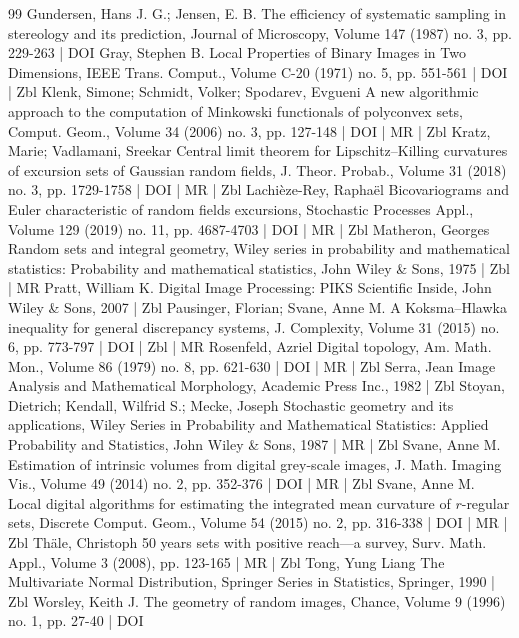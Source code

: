 \documentclass[10pt]{amsart}
\theoremstyle{definition}\newtheorem{defi}[theo]{Definition}\newtheorem{rema}[theo]{Remark}\newtheorem{exam}[theo]{Example}\newtheorem{exem}[theo]{Example}\newtheorem{nota}[theo]{Notation}
\begin{document}
\begin{thebibliography}{99}
Gundersen, Hans J. G.; Jensen, E. B. The efficiency of systematic sampling in stereology and its prediction, Journal of Microscopy, Volume 147 (1987) no. 3, pp. 229-263 | DOI
Gray, Stephen B. Local Properties of Binary Images in Two Dimensions, IEEE Trans. Comput., Volume C-20 (1971) no. 5, pp. 551-561 | DOI | Zbl
Klenk, Simone; Schmidt, Volker; Spodarev, Evgueni A new algorithmic approach to the computation of Minkowski functionals of polyconvex sets, Comput. Geom., Volume 34 (2006) no. 3, pp. 127-148 | DOI | MR | Zbl
Kratz, Marie; Vadlamani, Sreekar Central limit theorem for Lipschitz–Killing curvatures of excursion sets of Gaussian random fields, J. Theor. Probab., Volume 31 (2018) no. 3, pp. 1729-1758 | DOI | MR | Zbl
Lachièze-Rey, Raphaël Bicovariograms and Euler characteristic of random fields excursions, Stochastic Processes Appl., Volume 129 (2019) no. 11, pp. 4687-4703 | DOI | MR | Zbl
Matheron, Georges Random sets and integral geometry, Wiley series in probability and mathematical statistics: Probability and mathematical statistics, John Wiley \& Sons, 1975 | Zbl | MR
Pratt, William K. Digital Image Processing: PIKS Scientific Inside, John Wiley \& Sons, 2007 | Zbl
Pausinger, Florian; Svane, Anne M. A Koksma–Hlawka inequality for general discrepancy systems, J. Complexity, Volume 31 (2015) no. 6, pp. 773-797 | DOI | Zbl | MR
Rosenfeld, Azriel Digital topology, Am. Math. Mon., Volume 86 (1979) no. 8, pp. 621-630 | DOI | MR | Zbl
Serra, Jean Image Analysis and Mathematical Morphology, Academic Press Inc., 1982 | Zbl
Stoyan, Dietrich; Kendall, Wilfrid S.; Mecke, Joseph Stochastic geometry and its applications, Wiley Series in Probability and Mathematical Statistics: Applied Probability and Statistics, John Wiley \& Sons, 1987 | MR | Zbl
Svane, Anne M. Estimation of intrinsic volumes from digital grey-scale images, J. Math. Imaging Vis., Volume 49 (2014) no. 2, pp. 352-376 | DOI | MR | Zbl
Svane, Anne M. Local digital algorithms for estimating the integrated mean curvature of $r$-regular sets, Discrete Comput. Geom., Volume 54 (2015) no. 2, pp. 316-338 | DOI | MR | Zbl
Thäle, Christoph 50 years sets with positive reach—a survey, Surv. Math. Appl., Volume 3 (2008), pp. 123-165 | MR | Zbl
Tong, Yung Liang The Multivariate Normal Distribution, Springer Series in Statistics, Springer, 1990 | Zbl
Worsley, Keith J. The geometry of random images, Chance, Volume 9 (1996) no. 1, pp. 27-40 | DOI
\end{thebibliography}
\end{document}
